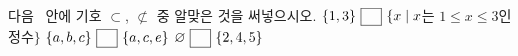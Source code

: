 다음 \blank\ 안에 기호 $\subset$, $\not\subset$ 중 알맞은 것을 써넣으시오.
 $\{1{,}\mkern3mu\mathopen{}3\}\ \blank\ \{x \mid x$는 $1\le x\le 3$인 정수$\}$
 $\{a{,}\mkern3mu\mathopen{}b{,}\mkern3mu\mathopen{}c\}\ \blank\ \{a{,}\mkern3mu\mathopen{}c{,}\mkern3mu\mathopen{}e\}$
 $\varnothing\ \blank\ \{2{,}\mkern3mu\mathopen{}4{,}\mkern3mu\mathopen{}5\}$
